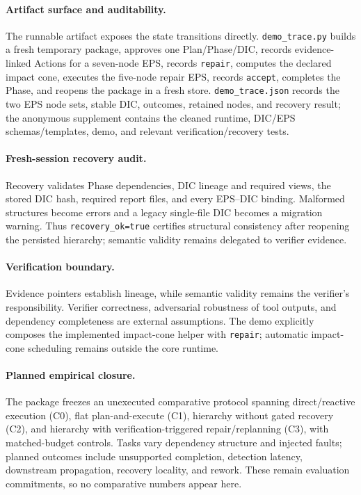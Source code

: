 \documentclass{article}
\begin{document}
\paragraph{Artifact surface and auditability.}
The runnable artifact exposes the state transitions directly. \texttt{demo\_trace.py} builds a fresh temporary package, approves one Plan/Phase/DIC, records evidence-linked Actions for a seven-node EPS, records \texttt{repair}, computes the declared impact cone, executes the five-node repair EPS, records \texttt{accept}, completes the Phase, and reopens the package in a fresh store. \texttt{demo\_trace.json} records the two EPS node sets, stable DIC, outcomes, retained nodes, and recovery result; the anonymous supplement contains the cleaned runtime, DIC/EPS schemas/templates, demo, and relevant verification/recovery tests.

\paragraph{Fresh-session recovery audit.}
Recovery validates Phase dependencies, DIC lineage and required views, the stored DIC hash, required report files, and every EPS--DIC binding. Malformed structures become errors and a legacy single-file DIC becomes a migration warning. Thus \texttt{recovery\_ok=true} certifies structural consistency after reopening the persisted hierarchy; semantic validity remains delegated to verifier evidence.

\paragraph{Verification boundary.}
Evidence pointers establish lineage, while semantic validity remains the verifier's responsibility. Verifier correctness, adversarial robustness of tool outputs, and dependency completeness are external assumptions. The demo explicitly composes the implemented impact-cone helper with \texttt{repair}; automatic impact-cone scheduling remains outside the core runtime.

\paragraph{Planned empirical closure.}
The package freezes an unexecuted comparative protocol spanning direct/reactive execution (C0), flat plan-and-execute (C1), hierarchy without gated recovery (C2), and hierarchy with verification-triggered repair/replanning (C3), with matched-budget controls. Tasks vary dependency structure and injected faults; planned outcomes include unsupported completion, detection latency, downstream propagation, recovery locality, and rework. These remain evaluation commitments, so no comparative numbers appear here.
\end{document}
